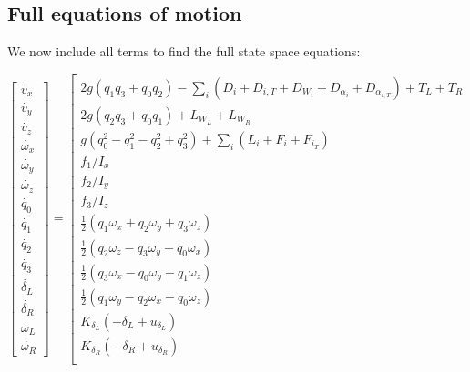 \subsection{Full equations of motion}

We now include all terms to find the full state space equations:

\begin{equation}
\left[
\begin{matrix}
    \dot{v_x} \\
    \dot{v_y} \\
    \dot{v_z} \\
    \dot{\omega_x} \\ 
    \dot{\omega_y} \\
    \dot{\omega_z} \\
    \dot{q_0} \\
    \dot{q_1} \\
    \dot{q_2} \\
    \dot{q_3} \\
    \dot{\delta_L} \\
    \dot{\delta_R} \\
    \dot{\omega_L} \\
    \dot{\omega_R} 
\end{matrix} \right] 
=
\left[ \begin{matrix}
 2g(q_1 q_3 + q_0 q_2)
    - \sum_i \left(
     D_i
    + D_{i,T}
    + D_{W_i}
    + D_{\alpha_i}
    + D_{\alpha_{i,T}} \right)
    + T_L + T_R \\
 2g(q_2 q_3 + q_0 q_1)
 + L_{W_L} + L_{W_R} \\
 g(q_0^2 - q_1^2 - q_2^2 + q_3^2)
 + \sum_i \left( L_i + F_i + F_{i_T}
  \right) \\
f_1/I_x \\
f_2/I_y \\
f_3/I_z \\
        \frac{1}{2} (q_1 \omega_x + q_2 \omega_y + q_3 \omega_z) & \\
        \frac{1}{2} (q_2 \omega_z - q_3 \omega_y - q_0 \omega_x) & \\
        \frac{1}{2} (q_3 \omega_x - q_0 \omega_y - q_1 \omega_z) & \\
        \frac{1}{2} (q_1 \omega_y - q_2 \omega_x - q_0 \omega_z) & \\
K_{\delta_L} (-\delta_L + u_{\delta_L}) \\
K_{\delta_R} (-\delta_R + u_{\delta_R}) \\

\end{matrix}
\end{equation}
